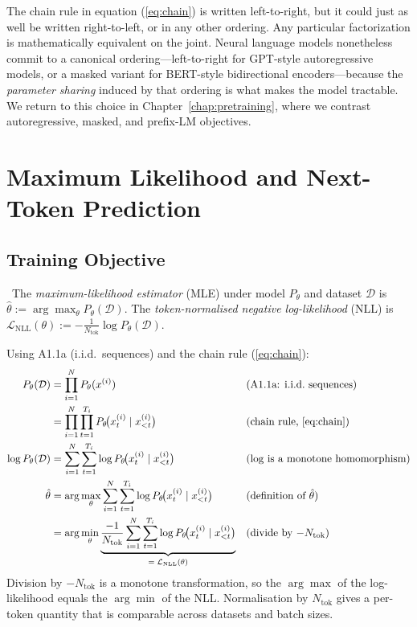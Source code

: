 The chain rule in equation (\ref{eq:chain}) is written left-to-right, but it could just as well be written right-to-left, or in any other ordering. Any particular factorization is mathematically equivalent on the joint. Neural language models nonetheless commit to a canonical ordering---left-to-right for GPT-style autoregressive models, or a masked variant for BERT-style bidirectional encoders---because the \emph{parameter sharing} induced by that ordering is what makes the model tractable. We return to this choice in Chapter~\ref{chap:pretraining}, where we contrast autoregressive, masked, and prefix-LM objectives.

\section{Maximum Likelihood and Next-Token Prediction}

\subsection{Training Objective}

\Def\ The \emph{maximum-likelihood estimator} (MLE) under model
$P_\theta$ and dataset $\mathcal{D}$ is
$\hat\theta := \arg\max_\theta P_\theta(\mathcal{D})$. The
\emph{token-normalised negative log-likelihood} (NLL) is
$\mathcal{L}_{\mathrm{NLL}}(\theta) := -\frac{1}{N_{\mathrm{tok}}}
\log P_\theta(\mathcal{D})$.

\begin{derivation}
Using A1.1a (i.i.d.\ sequences) and the chain rule (\ref{eq:chain}):
\begin{align}
P_\theta(\mathcal{D})
  &= \prod_{i=1}^{N} P_\theta(x^{(i)})
  && \text{(A1.1a: i.i.d.\ sequences)} \label{eq:mle-1} \\
  &= \prod_{i=1}^{N} \prod_{t=1}^{T_i}
       P_\theta\!\big(x^{(i)}_t \mid x^{(i)}_{<t}\big)
  && \text{(chain rule, \ref{eq:chain})} \label{eq:mle-2} \\
  \log P_\theta(\mathcal{D})
  &= \sum_{i=1}^{N} \sum_{t=1}^{T_i}
       \log P_\theta\!\big(x^{(i)}_t \mid x^{(i)}_{<t}\big)
  && \text{($\log$ is a monotone homomorphism)} \label{eq:mle-3} \\
  \hat\theta
  &= \arg\max_\theta
       \sum_{i=1}^{N} \sum_{t=1}^{T_i}
       \log P_\theta\!\big(x^{(i)}_t \mid x^{(i)}_{<t}\big)
  && \text{(definition of $\hat\theta$)} \label{eq:mle-4} \\
  &= \arg\min_\theta
       \underbrace{\frac{-1}{N_{\mathrm{tok}}}
       \sum_{i=1}^{N} \sum_{t=1}^{T_i}
       \log P_\theta\!\big(x^{(i)}_t \mid x^{(i)}_{<t}\big)}_{=\;\mathcal{L}_{\mathrm{NLL}}(\theta)}
  && \text{(divide by $-N_{\mathrm{tok}}$)} \label{eq:mle}
\end{align}
Division by $-N_{\mathrm{tok}}$ is a monotone transformation, so the
$\arg\max$ of the log-likelihood equals the $\arg\min$ of the NLL.
Normalisation by $N_{\mathrm{tok}}$ gives a per-token quantity that is
comparable across datasets and batch sizes.
\end{derivation}

